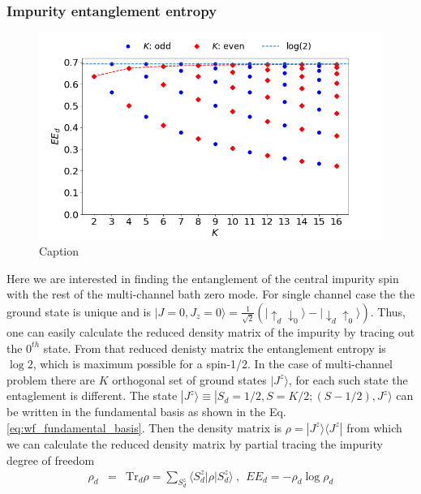 \documentclass[reprint,prb,superscriptaddress]{revtex4-1}
\begin{document}
\subsubsection{Impurity entanglement entropy}
\begin{figure}[!h]
\centering
\includegraphics[scale=0.32]{plt/EE_multi_channel_ANN.png}
\caption{Caption }
\label{fig:EE_d}
\end{figure}
\noindent Here we are interested in finding the entanglement of the central impurity spin with the rest of the multi-channel bath zero mode. For single channel case the the ground state is unique and is $|J=0,J_z=0 \rangle = \frac{1}{\sqrt{2}} (|\uparrow_{d}\downarrow_0\rangle -|\downarrow_d \uparrow_0\rangle)$. Thus, one can easily calculate the reduced density matrix of the impurity by tracing out the $0^{th}$ state. From that reduced denisty matrix the entanglement entropy is $\log 2$, which is maximum possible for a spin-1/2. In the case of multi-channel problem there are $K$ orthogonal set of ground states $|J^z\rangle$, for each such state the entaglement is different. The state $|J^z\rangle \equiv |S_d=1/2,S=K/2;(S-1/2),J^z\rangle$ can be written in the fundamental basis as shown in the Eq.\eqref{eq:wf_fundamental_basis}. Then the density matrix is $\rho=|J^z\rangle\langle J^z|$ from which we can calculate the reduced density matrix by partial tracing the impurity degree of freedom 
\begin{eqnarray}
\rho_{d}&=& \textrm{Tr}_{d} \rho=\sum_{S_d^z} \langle S_d^z| \rho | S^z_d\rangle ~,~~EE_d = -\rho_{d} \log \rho_{d}
\end{eqnarray}
\end{document}
